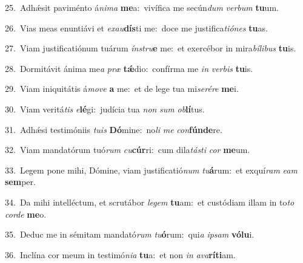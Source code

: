 {\numbfont\textcolor{\numbcolor}{25.}}~Adhǽsit paviménto á\-\textit{ni}\-\textit{ma} \textbf{me}\-a:~\star vivífica me secún\textit{dum} \textit{ver}\-\textit{bum} \textbf{tu}\-um.\par
{\numbfont\textcolor{\numbcolor}{26.}}~Vias meas enuntiávi et \textit{ex}\-\textit{au}\textbf{dís}ti me:~\star doce me justifica\-\textit{ti}\-\textit{ó}\textit{nes} \textbf{tu}\-as.\par
{\numbfont\textcolor{\numbcolor}{27.}}~Viam justificatiónum tuárum \textit{ín}\-\textit{stru}\textbf{e} me:~\star et exercébor in mira\-\textit{bí}\-\textit{li}\textit{bus} \textbf{tu}\-is.\par
{\numbfont\textcolor{\numbcolor}{28.}}~Dormitávit ánima me\textit{a} \textit{præ} \textbf{tǽ}\-dio:~\star confírma me \textit{in} \textit{ver}\-\textit{bis} \textbf{tu}\-is.\par
{\numbfont\textcolor{\numbcolor}{29.}}~Viam iniquitátis á\-\textit{mo}\-\textit{ve} \textbf{a} me:~\star et de lege tua mi\-\textit{se}\-\textit{ré}\textit{re} \textbf{me}\-i.\par
{\numbfont\textcolor{\numbcolor}{30.}}~Viam veritá\textit{tis} \textit{e}\-\textbf{lé}gi:~\star judícia tua \textit{non} \textit{sum} \textit{ob}\-\textbf{lí}tus.\par
{\numbfont\textcolor{\numbcolor}{31.}}~Adhǽsi testimóniis \textit{tu}\-\textit{is} \textbf{Dó}\-mine:~\star no\textit{li} \textit{me} \textit{con}\-\textbf{fún}\textbf{de}re.\par
{\numbfont\textcolor{\numbcolor}{32.}}~Viam mandatórum tuó\textit{rum} \textit{cu}\-\textbf{cúr}ri:~\star cum dila\-\textit{tás}\-\textit{ti} \textit{cor} \textbf{me}\-um.\par
{\numbfont\textcolor{\numbcolor}{33.}}~Legem pone mihi, Dómine, viam justificatió\textit{num} \textit{tu}\-\textbf{á}rum:~\star et exquí\textit{ram} \textit{e}\-\textit{am} \textbf{sem}\-per.\par
{\numbfont\textcolor{\numbcolor}{34.}}~Da mihi intelléctum, et scrutábor \textit{le}\-\textit{gem} \textbf{tu}\-am:~\star et custódiam illam in to\textit{to} \textit{cor}\-\textit{de} \textbf{me}\-o.\par
{\numbfont\textcolor{\numbcolor}{35.}}~Deduc me in sémitam mandató\textit{rum} \textit{tu}\-\textbf{ó}rum:~\star qui\textit{a} \textit{ip}\-\textit{sam} \textbf{vó}\-\textbf{lu}i.\par
{\numbfont\textcolor{\numbcolor}{36.}}~Inclína cor meum in testimó\-\textit{ni}\-\textit{a} \textbf{tu}\-a:~\star et non \textit{in} \textit{a}\-\textit{va}\textbf{rí}\textbf{ti}am.\par
